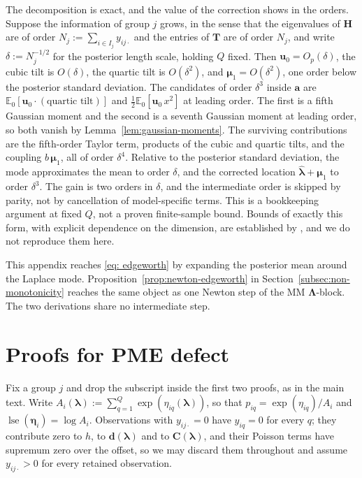 \begin{remark}
The decomposition is exact, and the value of the correction shows in the orders. Suppose the information of group $j$ grows, in the sense that the eigenvalues of $\mathbf{H}$ are of order $N_{j}:=\sum_{i\in I_{j}}y_{ij\cdot}$ and the entries of $\mathbf{T}$ are of order $N_{j}$, and write $\delta:=N_{j}^{-1/2}$ for the posterior length scale, holding $Q$ fixed. Then $\bm{u}_{0}=O_{p}(\delta)$, the cubic tilt is $O(\delta)$, the quartic tilt is $O(\delta^{2})$, and $\bm{\mu}_{1}=O(\delta^{2})$, one order below the posterior standard deviation. The candidates of order $\delta^{3}$ inside $\bm{a}$ are $\mathbb{E}_{0}[\bm{u}_{0}\cdot(\text{quartic tilt})]$ and $\frac{1}{2}\mathbb{E}_{0}[\bm{u}_{0}\,x^{2}]$ at leading order. The first is a fifth Gaussian moment and the second is a seventh Gaussian moment at leading order, so both vanish by Lemma~\ref{lem:gaussian-moments}. The surviving contributions are the fifth-order Taylor term, products of the cubic and quartic tilts, and the coupling $b\,\bm{\mu}_{1}$, all of order $\delta^{4}$. Relative to the posterior standard deviation, the mode approximates the mean to order $\delta$, and the corrected location $\hat{\bm{\lambda}}+\bm{\mu}_{1}$ to order $\delta^{3}$. The gain is two orders in $\delta$, and the intermediate order is skipped by parity, not by cancellation of model-specific terms. This is a bookkeeping argument at fixed $Q$, not a proven finite-sample bound. Bounds of exactly this form, with explicit dependence on the dimension, are established by \citet{Katsevich2024}, and we do not reproduce them here.
\label{rem:order-bookkeeping}
\end{remark}

\begin{remark}
This appendix reaches \eqref{eq: edgeworth} by expanding the posterior mean around the Laplace mode. Proposition~\ref{prop:newton-edgeworth} in Section~\ref{subsec:non-monotonicity} reaches the same object as one Newton step of the MM $\bm{\Lambda}$-block. The two derivations share no intermediate step.
\label{rem:two-routes}
\end{remark}

\section{Proofs for PME defect}
\label{app:pme-defect-proofs}

Fix a group $j$ and drop the subscript inside the first two proofs, as in the main text. Write $A_{i}(\bm{\lambda}):=\sum_{q=1}^{Q}\exp(\eta_{iq}(\bm{\lambda}))$, so that $p_{iq}=\exp(\eta_{iq})/A_{i}$ and $\operatorname{lse}(\bm{\eta}_{i})=\log A_{i}$. Observations with $y_{ij\cdot}=0$ have $y_{iq}=0$ for every $q$; they contribute zero to $h$, to $\mathbf{d}(\bm{\lambda})$ and to $\mathbf{C}(\bm{\lambda})$, and their Poisson terms have supremum zero over the offset, so we may discard them throughout and assume $y_{ij\cdot}>0$ for every retained observation.


